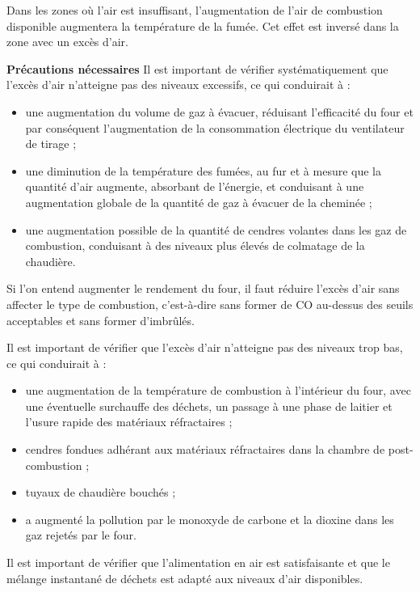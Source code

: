 Dans les zones où l'air est insuffisant, l'augmentation de l'air de combustion disponible augmentera la température de la fumée. Cet effet est inversé dans la zone avec un excès d'air.

\vspace{0.3cm}
\textbf{Précautions nécessaires}
\vspace{0.3cm}
Il est important de vérifier systématiquement que l'excès d'air n'atteigne pas des niveaux excessifs, ce qui conduirait à :
\begin{itemize}
    \item une augmentation du volume de gaz à évacuer, réduisant l'efficacité du four et par conséquent l'augmentation de la consommation électrique du ventilateur de tirage ;
    \item une diminution de la température des fumées, au fur et à mesure que la quantité d'air augmente, absorbant de l'énergie, et conduisant à une augmentation globale de la quantité de gaz à évacuer de la cheminée ;
    \item une augmentation possible de la quantité de cendres volantes dans les gaz de combustion, conduisant à des niveaux plus élevés de colmatage de la chaudière. 
\end{itemize}

Si l'on entend augmenter le rendement du four, il faut réduire l'excès d'air sans affecter le type de combustion, c'est-à-dire sans former de CO au-dessus des seuils acceptables et sans former d'imbrûlés. 

Il est important de vérifier que l'excès d'air n'atteigne pas des niveaux trop bas, ce qui conduirait à :
\begin{itemize}
    \item une augmentation de la température de combustion à l'intérieur du four, avec une éventuelle surchauffe des déchets, un passage à une phase de laitier et l'usure rapide des matériaux réfractaires ;
    \item cendres fondues adhérant aux matériaux réfractaires dans la chambre de post-combustion ;
    \item tuyaux de chaudière bouchés ;
    \item a augmenté la pollution par le monoxyde de carbone et la dioxine dans les gaz rejetés par le four.
\end{itemize}


Il est important de vérifier que l'alimentation en air est satisfaisante et que le mélange instantané de déchets est adapté aux niveaux d'air disponibles.

